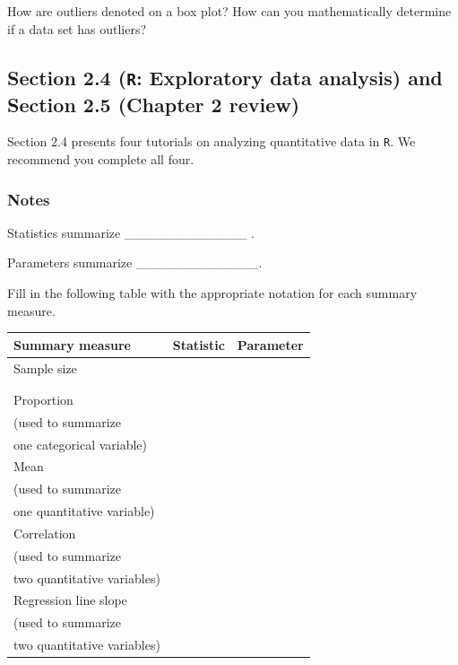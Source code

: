\documentclass[
]{report}
\newcommand{\rgs}{\vspace{12pt}} %
\begin{document}
How are outliers denoted on a box plot? How can you mathematically determine if a data set has outliers?
\rgs

\hypertarget{section-2.4-r-exploratory-data-analysis-and-section-2.5-chapter-2-review}{%
\subsection*{\texorpdfstring{Section 2.4 (\texttt{R}: Exploratory data analysis) and Section 2.5 (Chapter 2 review)}{Section 2.4 (R: Exploratory data analysis) and Section 2.5 (Chapter 2 review)}}\label{section-2.4-r-exploratory-data-analysis-and-section-2.5-chapter-2-review}}

Section 2.4 presents four tutorials on analyzing quantitative data in \texttt{R}. We recommend you complete all four.

\hypertarget{notes-7}{%
\subsubsection*{Notes}\label{notes-7}}

Statistics summarize \_\_\_\_\_\_\_\_\_\_\_\_\_ .

Parameters summarize \_\_\_\_\_\_\_\_\_\_\_\_\_.

Fill in the following table with the appropriate notation for each summary measure.

\begin{center}
\begin{tabular}{|l|p{2in}|p{2in}|}\hline
Summary measure & Statistic & Parameter \\ \hline
Sample size & & \\ 
& & \\ 
& & \\ \hline
Proportion & & \\ 
(used to summarize & & \\ 
one categorical variable) & & \\ \hline
Mean & & \\ 
(used to summarize & & \\ 
one quantitative variable)& & \\ \hline
Correlation & & \\ 
(used to summarize & & \\ 
two quantitative variables)& & \\ \hline
Regression line slope & & \\ 
(used to summarize & & \\ 
two quantitative variables)& & \\ \hline
\end{tabular}
\end{center}
\end{document}
